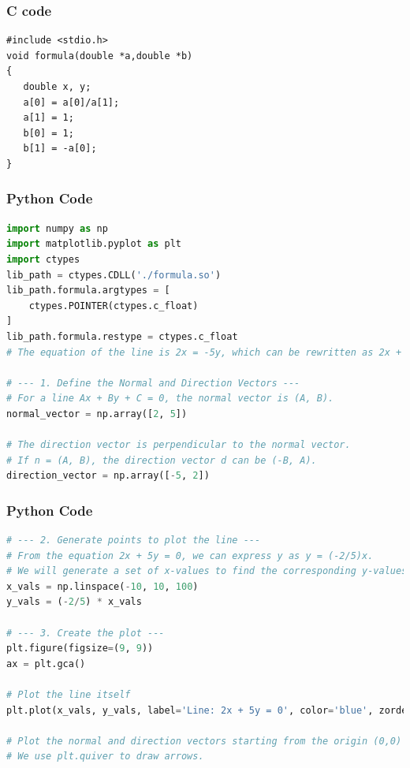 \documentclass{beamer}
\begin{document}
\begin{frame}[fragile]
    \frametitle{C code}
    \begin{lstlisting}
#include <stdio.h>
void formula(double *a,double *b)
{
   double x, y;
   a[0] = a[0]/a[1];
   a[1] = 1;
   b[0] = 1;
   b[1] = -a[0]; 
}
    \end{lstlisting}
\end{frame}

\begin{frame}[fragile]
    \frametitle{Python Code}
    \begin{lstlisting}[language=Python]
import numpy as np
import matplotlib.pyplot as plt
import ctypes
lib_path = ctypes.CDLL('./formula.so')
lib_path.formula.argtypes = [
    ctypes.POINTER(ctypes.c_float)
]
lib_path.formula.restype = ctypes.c_float
# The equation of the line is 2x = -5y, which can be rewritten as 2x + 5y = 0.

# --- 1. Define the Normal and Direction Vectors ---
# For a line Ax + By + C = 0, the normal vector is (A, B).
normal_vector = np.array([2, 5])

# The direction vector is perpendicular to the normal vector.
# If n = (A, B), the direction vector d can be (-B, A).
direction_vector = np.array([-5, 2])
    \end{lstlisting}
\end{frame}

\begin{frame}[fragile]
    \frametitle{Python Code}
    \begin{lstlisting}[language=Python]
# --- 2. Generate points to plot the line ---
# From the equation 2x + 5y = 0, we can express y as y = (-2/5)x.
# We will generate a set of x-values to find the corresponding y-values.
x_vals = np.linspace(-10, 10, 100)
y_vals = (-2/5) * x_vals

# --- 3. Create the plot ---
plt.figure(figsize=(9, 9))
ax = plt.gca()

# Plot the line itself
plt.plot(x_vals, y_vals, label='Line: 2x + 5y = 0', color='blue', zorder=1)

# Plot the normal and direction vectors starting from the origin (0,0)
# We use plt.quiver to draw arrows.
    \end{lstlisting}
\end{frame}
\end{document}
